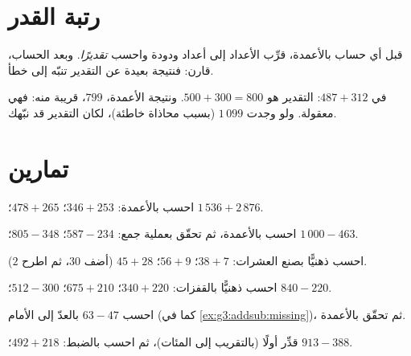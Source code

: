 \section{رتبة القدر}

\begin{method}\label{met:g3:addsub:estimate}
قبل أي حساب بالأعمدة، قرِّب الأعداد إلى أعداد ودودة واحسب
\emph{تقديرًا}. وبعد الحساب، قارن: فنتيجة بعيدة عن التقدير تنبّه
إلى خطأ.
\end{method}

\begin{example}
في $487 + 312$: التقدير هو $500 + 300 = 800$. ونتيجة الأعمدة،
$799$، قريبة منه: فهي معقولة. ولو وجدت $1\,099$
(بسبب محاذاة خاطئة)، لكان التقدير قد نبّهك.
\end{example}

\section{تمارين}

\begin{exercise}[$\star$]\label{exo:g3:addsub:1}
احسب بالأعمدة: $346 + 253$؛ \quad $478 + 265$؛ \quad
$1\,536 + 2\,876$.
\end{exercise}

\begin{exercise}[$\star$]\label{exo:g3:addsub:2}
احسب بالأعمدة، ثم تحقّق بعملية جمع: $587 - 234$؛ \quad
$805 - 348$؛ \quad $1\,000 - 463$.
\end{exercise}

\begin{exercise}[$\star$]\label{exo:g3:addsub:3}
احسب ذهنيًّا بصنع العشرات: $38 + 7$؛ \quad $56 + 9$؛ \quad
$45 + 28$ (أضف $30$، ثم اطرح $2$).
\end{exercise}

\begin{exercise}[$\star$]\label{exo:g3:addsub:4}
احسب ذهنيًّا بالقفزات: $340 + 220$؛ \quad $675 + 210$؛ \quad
$512 - 300$؛ \quad $840 - 220$.
\end{exercise}

\begin{exercise}[$\star$]\label{exo:g3:addsub:5}
احسب $63 - 47$ بالعدّ إلى الأمام (كما في
\cref{ex:g3:addsub:missing})، ثم تحقّق بالأعمدة.
\end{exercise}

\begin{exercise}[$\star$]\label{exo:g3:addsub:6}
قدِّر أولًا (بالتقريب إلى المئات)، ثم احسب بالضبط:
$492 + 218$؛ \quad $913 - 388$.
\end{exercise}

